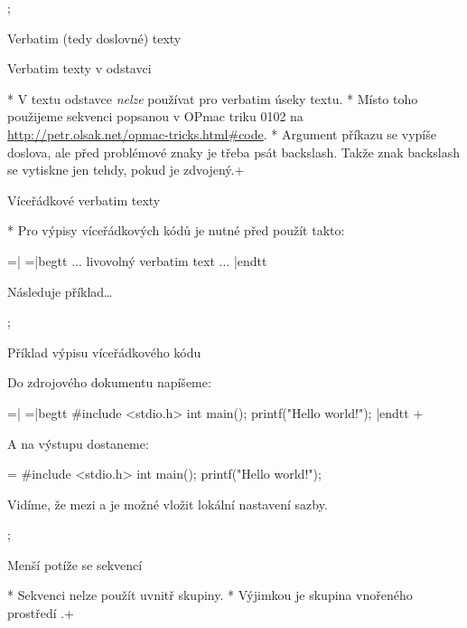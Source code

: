 \pg; %

\sec Verbatim (tedy doslovné) texty

\secc Verbatim texty v odstavci

* V textu odstavce {\it nelze} používat  pro verbatim úseky textu.
* Místo toho použijeme sekvenci  popsanou v OPmac triku
  0102 na \url{http://petr.olsak.net/opmac-tricks.html\#code}.
* Argument příkazu  se vypíše doslova, ale před problémové
  znaky je třeba psát backslash. Takže znak backslash se vytiskne jen tehdy, 
  pokud je zdvojený.\pg+

\secc Víceřádkové verbatim texty 

* Pro výpisy víceřádkových kódů je nutné před \code{\\begtt} použít \code{\\pg=}
  takto:

\pg=\adef|{\bslash}\begtt
\pg=|begtt
... livovolný verbatim text ...
|endtt
\endtt

Následuje příklad\dots

\pg; %

\sec Příklad výpisu víceřádkového kódu

Do zdrojového dokumentu napíšeme:

\pg=\adef|{\bslash}\begtt
\pg=\typosize[13/15]\Red|begtt
#include <stdio.h>
int main();
{
  printf("Hello world!\n");
}
|endtt
\endtt\pg+

A na výstupu dostaneme:

\pg=\typosize[13/15]\Red\begtt
#include <stdio.h>
int main();
{
  printf("Hello world!\n");
}
\endtt

Vidíme, že mezi \code{\\pg=} a \code{\\begtt} je možné vložit lokální
nastavení sazby.

\pg; %

\sec Menší potíže se sekvencí \code{\\pg+} 

* Sekvenci \code{\\pg+} nelze použít uvnitř skupiny.
* Výjimkou je skupina vnořeného prostředí .\pg+

